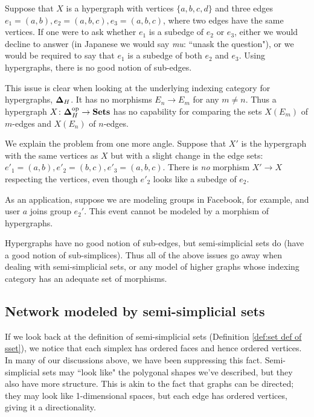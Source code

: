 \documentclass{amsart}
\def\bD{{\bf \Delta}}
\begin{document}
\begin{remark}\label{rem:sub-edge problem}

Suppose that $X$ is a hypergraph with vertices $\{a,b,c,d\}$ and three edges $e_1=(a,b),e_2=(a,b,c),e_3=(a,b,c)$, where two edges have the same vertices.  If one were to ask whether $e_1$ is a subedge of $e_2$ or $e_3$, either we would decline to answer (in Japanese we would say {\em mu}: ``unask the question"), or we would be required to say that $e_1$ is a subedge of both $e_2$ and $e_3$.  Using hypergraphs, there is no good notion of sub-edges.  

This issue is clear when looking at the underlying indexing category for hypergraphs, $\bD_H$.  It has no morphisms $E_n\to E_m$ for any $m\neq n$.  Thus a hypergraph $X\taking\bD_H\op\to\Sets$ has no capability for comparing the sets $X(E_m)$ of $m$-edges and $X(E_n)$ of $n$-edges.  

We explain the problem from one more angle.  Suppose that $X'$ is the hypergraph with the same vertices as $X$ but with a slight change in the edge sets: $e'_1=(a,b),e'_2=(b,c),e'_3=(a,b,c)$.  There is {\em no} morphism $X'\to X$ respecting the vertices, even though $e'_2$ looks like a subedge of $e_2$.   

As an application, suppose we are modeling groups in Facebook, for example, and user $a$ joins group $e_2'$.  This event cannot be modeled by a morphism of hypergraphs. 

Hypergraphs have no good notion of sub-edges, but semi-simplicial sets do (have a good notion of sub-simplices).  Thus all of the above issues go away when dealing with semi-simplicial sets, or any model of higher graphs whose indexing category has an adequate set of morphisms.

\end{remark}

\subsection{Network modeled by semi-simplicial sets}\label{subsec:ssets}

If we look back at the definition of semi-simplicial sets (Definition \ref{def:set def of sset}), we notice that each simplex has ordered faces and hence ordered vertices.  In many of our discussions above, we have been suppressing this fact.  Semi-simplicial sets may ``look like" the polygonal shapes we've described, but they also have more structure.    This is akin to the fact that graphs can be directed; they may look like 1-dimensional spaces, but each edge has ordered vertices, giving it a directionality.  
\end{document}
